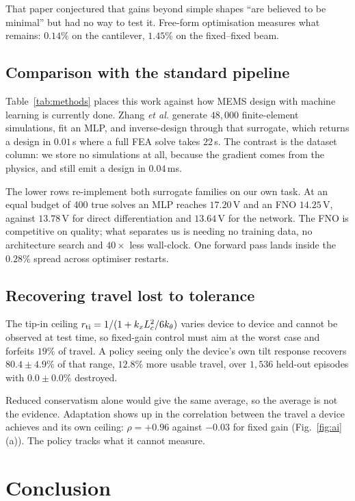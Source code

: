 \documentclass[conference,10pt]{IEEEtran}
\begin{document}
That paper conjectured that gains beyond simple shapes ``are believed to be
minimal'' but had no way to test it. Free-form optimisation measures what
remains: $0.14\%$ on the cantilever, $1.45\%$ on the fixed--fixed beam.

\subsection{Comparison with the standard pipeline}
Table~\ref{tab:methods} places this work against how MEMS design with machine
learning is currently done. Zhang \emph{et al.} \cite{zhang} generate
$48{,}000$ finite-element simulations, fit an MLP, and inverse-design through
that surrogate, which returns a design in $0.01$\,s where a full FEA solve
takes $22$\,s. The contrast is the dataset column: we store no simulations at
all, because the gradient comes from the physics, and still emit a design in
$0.04$\,ms.

The lower rows re-implement both surrogate families on our own task. At an
equal budget of 400 true solves an MLP reaches $17.20$\,V and an FNO
$14.25$\,V, against $13.78$\,V for direct differentiation and $13.64$\,V for
the network. The FNO is competitive on quality; what separates us is needing no
training data, no architecture search and $40\times$ less wall-clock. One
forward pass lands inside the $0.28\%$ spread across optimiser restarts.

\subsection{Recovering travel lost to tolerance}
The tip-in ceiling $r_{\rm ti}=1/(1+k_xL_c^2/6k_\theta)$ varies device to
device and cannot be observed at test time, so fixed-gain control must aim at
the worst case and forfeits $19\%$ of travel. A policy seeing only the device's
own tilt response recovers $80.4\pm4.9\%$ of that range, $12.8\%$ more usable
travel, over $1{,}536$ held-out episodes with $0.0\pm0.0\%$ destroyed.

Reduced conservatism alone would give the same average, so the average is not
the evidence. Adaptation shows up in the correlation between the travel a
device achieves and its own ceiling: $\rho=+0.96$ against $-0.03$ for fixed
gain (Fig.~\ref{fig:ai}(a)). The policy tracks what it cannot measure.


\section{Conclusion}
\end{document}

